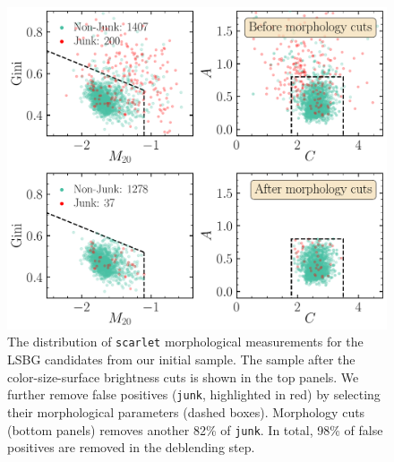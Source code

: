 \documentclass[twocolumn,astrosymb,twocolappendix,linenumbers]{aastex631}
\newcommand{\code}[1]{\texttt{#1}}
\begin{document}
\begin{CJK*}{UTF8}{gbsn}
\begin{figure}
    \centering
    \includegraphics[width=1\linewidth]{deblending_cuts_morph.pdf}
    \caption{The distribution of \code{scarlet} morphological measurements for the LSBG candidates from our initial sample. The sample after the color-size-surface brightness cuts is shown in the top panels. We further remove false positives (\code{junk}, highlighted in red) by selecting their morphological parameters (dashed boxes). Morphology cuts (bottom panels) removes another 82\% of \code{junk}. In total, 98\% of false positives are removed in the deblending step.
	}
	\label{fig:deblending_cuts}
\end{figure}


\end{CJK*}
\end{document}
